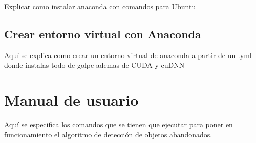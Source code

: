 Explicar como instalar anaconda con comandos para Ubuntu

\subsection{Crear entorno virtual con Anaconda}
\label{subsec:creacion-entorno}

Aquí se explica como crear un entorno virtual de anaconda a partir de un .yml donde instalas todo de golpe ademas de CUDA y cuDNN

\section{Manual de usuario}
\label{sec:manual-usuario}

Aquí se especifica los comandos que se tienen que ejecutar para poner en funcionamiento el algoritmo de detección de objetos abandonados.


